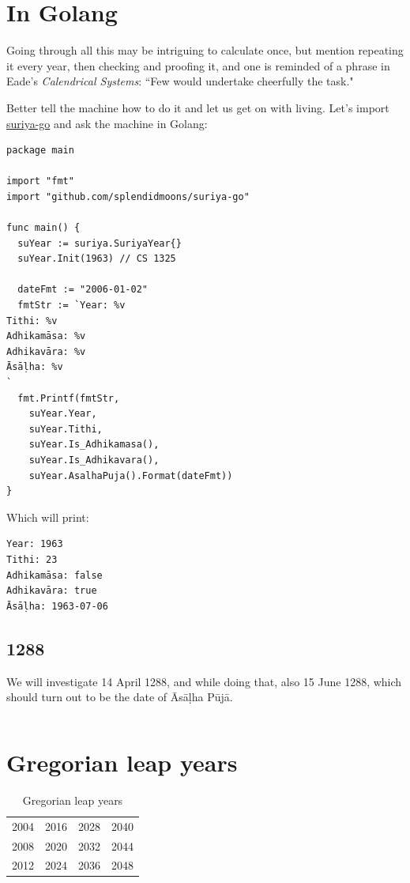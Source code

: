 \documentclass[11pt,oneside]{memoir-article}
\begin{document}
\clearpage

\chapter{In Golang}
\label{sec-7}
\label{suriya-go-example}

Going through all this may be intriguing to calculate once, but mention
repeating it every year, then checking and proofing it, and one is reminded of a
phrase in Eade's \emph{Calendrical Systems}: ``Few would undertake cheerfully the
task."\autocite{eade1995calendrical}

Better tell the machine how to do it and let us get on with living. Let's
import \href{https://github.com/splendidmoons/suriya-go}{suriya-go} and ask the machine in Golang:

\begin{verbatim}
package main

import "fmt"
import "github.com/splendidmoons/suriya-go"

func main() {
  suYear := suriya.SuriyaYear{}
  suYear.Init(1963) // CS 1325

  dateFmt := "2006-01-02"
  fmtStr := `Year: %v
Tithi: %v
Adhikamāsa: %v
Adhikavāra: %v
Āsāḷha: %v
`
  fmt.Printf(fmtStr,
    suYear.Year,
    suYear.Tithi,
    suYear.Is_Adhikamasa(),
    suYear.Is_Adhikavara(),
    suYear.AsalhaPuja().Format(dateFmt))
}
\end{verbatim}

Which will print:

\begin{verbatim}
Year: 1963
Tithi: 23
Adhikamāsa: false
Adhikavāra: true
Āsāḷha: 1963-07-06
\end{verbatim}

\section{1288}
\label{sec-7-1}
\label{golang-1288}

We will investigate 14 April 1288, and while doing that, also 15 June 1288,
which should turn out to be the date of Āsāḷha Pūjā.

\inputminted{go}{./includes/print-1288.go}

\chapter{Gregorian leap years}
\label{sec-8}

\begin{table}[h]
\caption{\label{tbl-cycle-leap-years} Gregorian leap years}
\centering
\begin{tabular}{rrrr}
2004 & 2016 & 2028 & 2040\\
2008 & 2020 & 2032 & 2044\\
2012 & 2024 & 2036 & 2048\\
\end{tabular}
\end{table}
\end{document}
